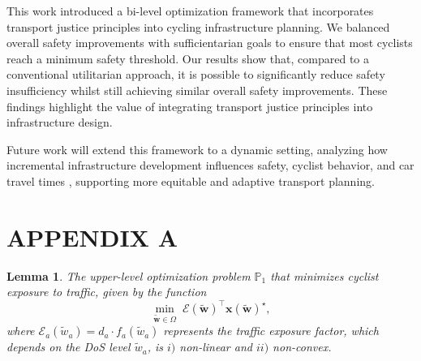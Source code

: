 \documentclass[letterpaper, 10 pt, conference]{ieeeconf}  %
\newtheorem{lemma}{Lemma}
\begin{document}

This work introduced a bi-level optimization framework that incorporates transport justice principles into cycling infrastructure planning. We balanced overall safety improvements with sufficientarian goals to ensure that most cyclists reach a minimum safety threshold.
Our results show that, compared to a conventional utilitarian approach, it is possible to significantly reduce safety insufficiency whilst still achieving similar overall safety improvements.
These findings highlight the value of integrating transport justice principles into infrastructure design.

Future work will extend this framework to a dynamic setting, analyzing how incremental infrastructure development influences safety, cyclist behavior, and car travel times \cite{mesbah2012bilevel}, supporting more equitable and adaptive transport planning.


\section*{APPENDIX A}
\label{appendix:proof}

\begin{lemma}
The upper-level optimization problem $\mathbb{P}_{1}$ that minimizes cyclist exposure to traffic, given by the function
\begin{equation}
    \min_{\tilde{\mathbf{w}} \in \Omega} \; \mathbf{\mathcal{E}}(\tilde{\mathbf{w}})^\top\mathbf{x}(\tilde{\mathbf{w}})^{\star},
\end{equation}
where $\mathcal{E}_a(\tilde{w}_a) = d_a \cdot f_a(\tilde{w}_a)$ represents the traffic exposure factor, which depends on the DoS level $\tilde{w}_a$, is \textit{$i)$} non-linear and \textit{$ii)$} non-convex.
\end{lemma}
\end{document}
